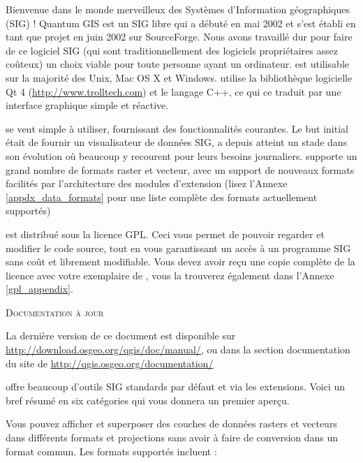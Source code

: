 \mainmatter
\pagestyle{scrheadings}
\label{label_forward}


Bienvenue dans le monde merveilleux des Systèmes d'Information géographiques (SIG) ! Quantum GIS est un SIG libre qui a débuté en mai 2002 et s'est établi en tant que projet en juin 2002 sur SourceForge. Nous avons travaillé dur pour faire de ce logiciel SIG (qui sont traditionnellement des logiciels propriétaires assez coûteux) un choix viable pour toute personne ayant un ordinateur. \qg est utilisable sur la majorité des Unix, Mac OS X et Windows. \qg utilise la bibliothèque logicielle Qt 4 (\url{http://www.trolltech.com}) et le langage C++, ce qui ce traduit par une interface graphique simple et réactive.

\qg se veut simple à utiliser, fournissant des fonctionnalités courantes. Le but initial était de fournir un visualisateur de données SIG, \qg a depuis atteint un stade dans son évolution où beaucoup y recourent pour leurs besoins journaliers. \qg supporte un grand nombre de formats raster et vecteur, avec un support de nouveaux formats facilités par l'architecture des modules d'extension (lisez l'Annexe \ref{appdx_data_formats} pour une liste complète des formats actuellement supportés)

\qg est distribué sous la licence GPL. Ceci vous permet de pouvoir regarder et modifier le code source, tout en vous garantissant un accès à un programme SIG sans coût et librement modifiable. Vous devez avoir reçu une copie complète de la licence avec votre exemplaire de \qg, vous la trouverez également dans l'Annexe \ref{gpl_appendix}.

\begin{Tip}\caption{\textsc{Documentation à jour}}
La dernière version de ce document est disponible sur \url{http://download.osgeo.org/qgis/doc/manual/}, ou dans la section documentation du site de \qg \url{http://qgis.osgeo.org/documentation/}
\end{Tip}

\label{label_majfeat}

\qg offre beaucoup d'outils SIG standards par défaut et via les extensions. Voici un bref résumé en six catégories qui vous donnera un premier aperçu.


Vous pouvez afficher et superposer des couches de données rasters et vecteurs dans différents formats et projections sans avoir à faire de conversion dans un format commun. Les formats supportés incluent :

